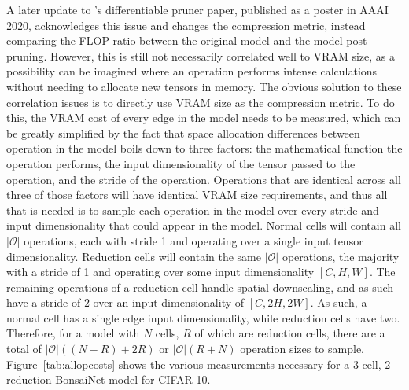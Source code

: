 A later update to \citeauthor{kim2019v2}'s differentiable pruner paper, published as a poster in AAAI 2020,
acknowledges this issue and changes the compression metric, instead comparing the FLOP ratio between the original model and the model post-pruning.
However, this is still not necessarily
correlated well to VRAM size, as a possibility can be imagined where an operation performs intense calculations
without needing to allocate new tensors in memory. The obvious solution to these correlation issues is to directly use
VRAM size as the compression metric. To do this, the VRAM cost of every edge in the model needs to be measured, which can
be greatly simplified by the fact that space allocation differences between operation in the model boils down to
three factors: the mathematical function the operation performs, the input dimensionality of the tensor passed to the
operation, and the stride of the operation. Operations that are identical across all three of those factors will have
identical VRAM size requirements, and thus all that is needed is to sample each operation in the model over every stride and
input dimensionality that could appear in the model. Normal cells will contain all $|\mathcal{O}|$ operations, each with
stride 1 and operating over a single input tensor dimensionality. Reduction cells will contain the same
$|\mathcal{O}|$ operations, the majority with a stride of 1 and operating over some input dimensionality $[C,H,W]$. The remaining
operations of a reduction cell handle spatial downscaling, and as such have a stride of 2 over an input dimensionality
of $[C,2H,2W]$. As such, a normal cell has a single edge input dimensionality, while reduction cells have two. Therefore,
for a model with $N$ cells, $R$ of which are reduction cells, there are a total of $|\mathcal{O}|((N-R)+2R)$
or $|\mathcal{O}|(R+N)$ operation sizes to sample. Figure~\ref{tab:allopcosts} shows the various measurements necessary
for a 3 cell, 2 reduction BonsaiNet model for CIFAR-10.

